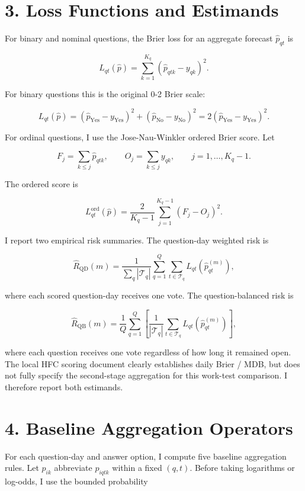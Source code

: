 \documentclass[
]{article}
\begin{document}
\section{3. Loss Functions and
Estimands}\label{loss-functions-and-estimands}

For binary and nominal questions, the Brier loss for an aggregate
forecast \(\hat p_{qt}\) is

\[
L_{qt}(\hat p)=\sum_{k=1}^{K_q}(\hat p_{qtk}-y_{qk})^2.
\]

For binary questions this is the original 0-2 Brier scale:

\[
L_{qt}(\hat p)=
(\hat p_{\mathrm{Yes}}-y_{\mathrm{Yes}})^2+
(\hat p_{\mathrm{No}}-y_{\mathrm{No}})^2
=2(\hat p_{\mathrm{Yes}}-y_{\mathrm{Yes}})^2.
\]

For ordinal questions, I use the Jose-Nau-Winkler ordered Brier score.
Let

\[
F_j = \sum_{k\le j}\hat p_{qtk}, \qquad
O_j = \sum_{k\le j}y_{qk}, \qquad j=1,\ldots,K_q-1.
\]

The ordered score is

\[
L^{\mathrm{ord}}_{qt}(\hat p)=
\frac{2}{K_q-1}\sum_{j=1}^{K_q-1}(F_j-O_j)^2.
\]

I report two empirical risk summaries. The question-day weighted risk is

\[
\widehat R_{\mathrm{QD}}(m)=
\frac{1}{\sum_q |\mathcal{T}_q|}
\sum_{q=1}^{Q}\sum_{t\in\mathcal{T}_q}
L_{qt}(\hat p^{(m)}_{qt}),
\]

where each scored question-day receives one vote. The question-balanced
risk is

\[
\widehat R_{\mathrm{QB}}(m)=
\frac{1}{Q}\sum_{q=1}^{Q}
\left[
\frac{1}{|\mathcal{T}_q|}
\sum_{t\in\mathcal{T}_q}
L_{qt}(\hat p^{(m)}_{qt})
\right],
\]

where each question receives one vote regardless of how long it remained
open. The local HFC scoring document clearly establishes daily Brier /
MDB, but does not fully specify the second-stage aggregation for this
work-test comparison. I therefore report both estimands.

\section{4. Baseline Aggregation
Operators}\label{baseline-aggregation-operators}

For each question-day and answer option, I compute five baseline
aggregation rules. Let \(p_{ik}\) abbreviate \(p_{iqtk}\) within a fixed
\((q,t)\). Before taking logarithms or log-odds, I use the bounded
probability
\end{document}
